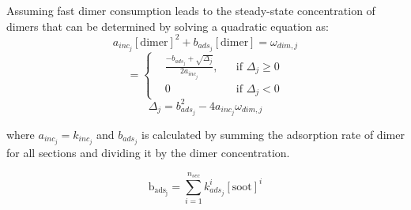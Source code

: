 Assuming fast dimer consumption leads to the steady-state concentration of dimers that can be determined by solving a quadratic equation as:
\begin{equation}
	a_{inc_j}[\mathrm{dimer}]^2+b_{ads_j}[\mathrm{dimer}]=\omega_{dim,j}
	\label{eqn:quad_dimcoal}
\end{equation}
\begin{equation}
	[\mathrm{Dimer_j}]=
	\left\{
	\begin{aligned}
		&\frac{-b_{ads_j}+\sqrt{\Delta_j}}{2a_{inc_j}},
		&&
		\text{if } \Delta_j \ge 0
		\\
		& 0 
		&&
		\text{if } \Delta_j < 0
	\end{aligned}
	\right.
	\label{eqn:dimer_dimcoal}
\end{equation}
\begin{equation}
	\Delta_j = b_{ads_j}^2-4a_{inc_j}\omega_{dim,j}
	\label{eqn:delta_dimcoal}
\end{equation}

\noindent where ${a_{inc_j} = k_{inc_{j}}}$ and ${b_{ads_j}}$ is calculated by summing the adsorption rate of dimer for all sections and dividing it by the dimer concentration.

\begin{equation}
	\mathrm{b_{ads_j}} = \sum_{i=1}^{n_{sec}} k^i_{ads_{j}} [\mathrm{soot}]^i
\end{equation}



